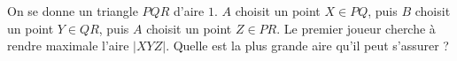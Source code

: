 On se donne un triangle $PQR$ d'aire $1$. $A$ choisit un point $X \in PQ$, puis $B$ choisit un point $Y \in QR$, puis $A$ choisit un point $Z \in PR$. Le premier joueur cherche à rendre maximale l'aire $|XYZ|$. Quelle est la plus grande aire qu'il peut s'assurer ?
